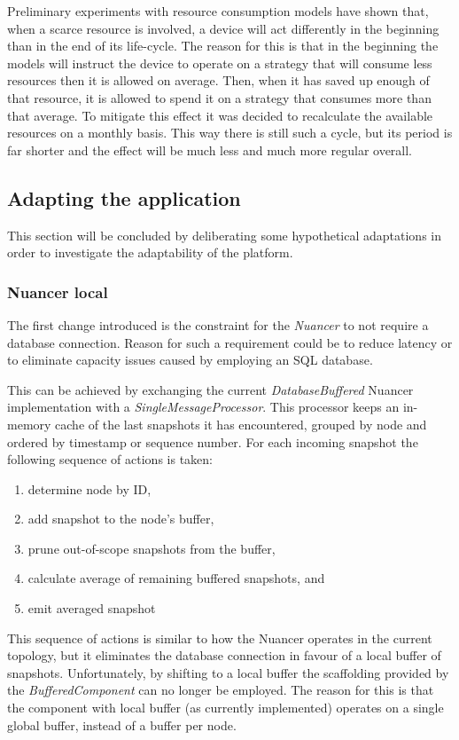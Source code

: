 Preliminary experiments with resource consumption models have shown that, when a scarce resource is involved, a device will act differently in the beginning than in the end of its life-cycle. The reason for this is that in the beginning the models will instruct the device to operate on a strategy that will consume less resources then it is allowed on average. Then, when it has saved up enough of that resource, it is allowed to spend it on a strategy that consumes more than that average. To mitigate this effect it was decided to recalculate the available resources on a monthly basis. This way there is still such a cycle, but its period is far shorter and the effect will be much less and much more regular overall.

\subsection{Adapting the application}
This section will be concluded by deliberating some hypothetical adaptations in order to investigate the adaptability of the platform.

\subsubsection{Nuancer local}
The first change introduced is the constraint for the \emph{Nuancer} to not require a database connection. Reason for such a requirement could be to reduce latency or to eliminate capacity issues caused by employing an SQL database.

This can be achieved by exchanging the current \emph{DatabaseBuffered} Nuancer implementation with a \emph{SingleMessageProcessor}. This processor keeps an in-memory cache of the last snapshots it has encountered, grouped by node and ordered by timestamp or sequence number. For each incoming snapshot the following sequence of actions is taken:
\begin{enumerate}
\nospace
\item determine node by ID,
\item add snapshot to the node's buffer,
\item prune out-of-scope snapshots from the buffer,
\item calculate average of remaining buffered snapshots, and
\item emit averaged snapshot
\end{enumerate}
This sequence of actions is similar to how the Nuancer operates in the current topology, but it eliminates the database connection in favour of a local buffer of snapshots. Unfortunately, by shifting to a local buffer the scaffolding provided by the \emph{BufferedComponent} can no longer be employed. The reason for this is that the component with local buffer (as currently implemented) operates on a single global buffer, instead of a buffer per node.

